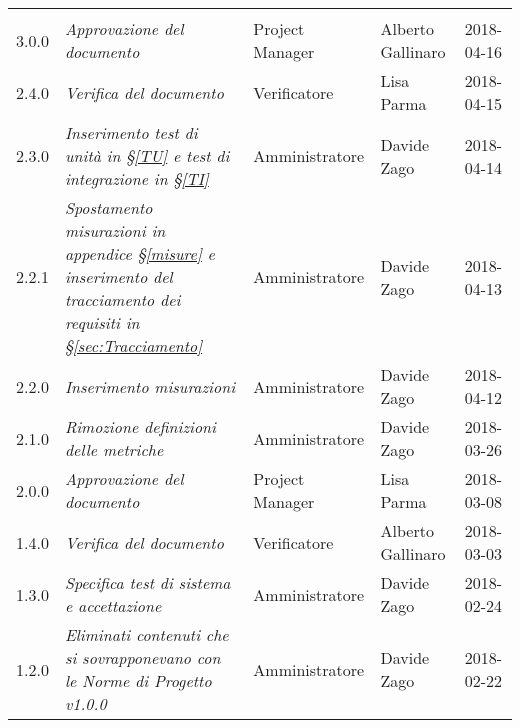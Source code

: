 
\section*{}

	\begin{longtable}[H]{C{2cm}|C{4cm}|C{3cm}|C{3cm}|R{2cm}}
		
		 & & & & \\
		
			3.0.0 & \emph{Approvazione del documento} & Project Manager & Alberto Gallinaro & 2018-04-16 \\
		\hline
		
		2.4.0 & \emph{Verifica del documento} & Verificatore &  Lisa Parma & 2018-04-15\\
		\hline
		
		2.3.0 & \emph{Inserimento test di unità in §\ref{TU}  e test di integrazione in §\ref{TI}} & Amministratore & Davide Zago & 2018-04-14 \\
		\hline
		
		2.2.1 & \emph{Spostamento misurazioni in appendice §\ref{misure} e inserimento del tracciamento dei requisiti in §\ref{sec:Tracciamento}} & Amministratore & Davide Zago & 2018-04-13 \\
		\hline
		
		2.2.0 & \emph{Inserimento misurazioni} & Amministratore & Davide Zago & 2018-04-12 \\
		\hline
		
		2.1.0 & \emph{Rimozione definizioni delle metriche} & Amministratore & Davide Zago & 2018-03-26 \\
		\hline

		2.0.0 & \emph{Approvazione del documento} & Project Manager & Lisa Parma & 2018-03-08 \\
		\hline
		
		1.4.0 & \emph{Verifica del documento} & Verificatore &  Alberto Gallinaro & 2018-03-03\\
		\hline
		
		1.3.0 & \emph{Specifica test di sistema e accettazione} & Amministratore &  Davide Zago & 2018-02-24 \\
		\hline
		
		1.2.0 & \emph{Eliminati contenuti che si sovrapponevano con le Norme di Progetto v1.0.0} & Amministratore &  Davide Zago & 2018-02-22 \\
		\hline
		

\end{longtable}
